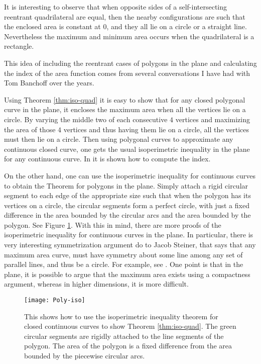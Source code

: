 \documentclass[11pt]{article}
\numberwithin{equation}{section}
\numberwithin{figure}{section}
\begin{document}
It is interesting to observe that when opposite sides of a self-intersecting reentrant quadrilateral are equal, then the nearby configurations are such that the enclosed area is constant at $0$, and they all lie on a circle or a straight line.  Nevertheless the maximum and minimum area occurs when the quadrilateral is a rectangle.

This idea of including the reentrant cases of polygons in the plane and calculating the index of the area function comes from several conversations I have had with Tom Banchoff over the years.  

Using Theorem \ref{thm:iso-quad} it is easy to show that for any closed polygonal curve in the plane, it encloses the maximum area when all the vertices lie on a circle.  By varying the middle two of each consecutive $4$ vertices and maximizing the area of those $4$ vertices and thus having them lie on a circle, all the vertices must then lie on a circle.  Then using polygonal curves to approximate any continuous closed curve, one gets the usual isoperimetric inequality in the plane for any continuous curve.  In \cite{Connelly-Brahma} it is shown how to compute the index.

On the other hand, one can use the isoperimetric inequality for continuous curves to obtain the Theorem for polygons in the plane.  Simply attach a rigid circular segment to each edge of the appropriate size such that when the polygon has its vertices on a circle, the circular segments form a perfect circle, with just a fixed difference in the area bounded by the circular arcs and the area bounded by the polygon.  See Figure \ref{fig:Polya}.  With this in mind, there are more proofs of the isoperimetric inequality for continuous curves in the plane.  In particular, there is very interesting symmetrization argument do to Jacob Steiner, that says that any maximum area curve, must have symmetry about some line among any set of parallel lines, and thus be a circle.  For example, see \cite{Niven-max-min}. One point is that in the plane, it is possible to argue that the maximum area exists using a compactness argument, whereas in higher dimensions, it is more difficult.
 
 \begin{figure}[!htb]
    \centering
        \texttt{[image: Poly-iso]}%
        \captionsetup{labelsep=colon,margin=2cm}
         \caption{This shows how to use the  isoperimetric inequality theorem for closed continuous curves to show Theorem \ref{thm:iso-quad}.  The green circular segments are rigidly attached to the line segments of the polygon.  The area of the polygon is a fixed difference from the area bounded by the piecewise circular arcs.}\label{fig:Polya}
    \end{figure}
    
\end{document}
